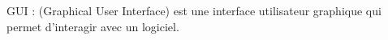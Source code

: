     \begin{definition}
        \newcommand{\lab}[6]{(\ref{#6})}

        GUI : (Graphical User Interface) est une interface utilisateur graphique qui permet d'interagir avec un logiciel.

        \label{def:GUI}
    \end{definition}




